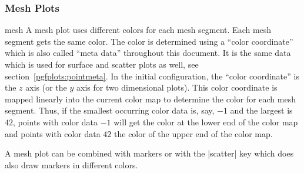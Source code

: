 \subsubsection{Mesh Plots}
\label{sec:2d:mesh}
\begin{plottype}[/pgfplots]{mesh}
	A mesh plot uses different colors for each mesh segment. Each mesh segment gets the same color. The color is determined using a ``color coordinate'' which is also called ``meta data'' throughout this document. It is the same data which is used for surface and scatter plots as well, see section~\ref{pgfplots:pointmeta}. In the initial configuration, the ``color coordinate'' is the $z$ axis (or the $y$ axis for two dimensional plots). This color coordinate is mapped linearly into the current color map to determine the color for each mesh segment. Thus, if the smallest occurring color data is, say, $-1$ and the largest is $42$, points with color data $-1$ will get the color at the lower end of the color map and points with color data $42$ the color of the upper end of the color map.

\pgfplotsexpensiveexample
\begin{codeexample}[]
\end{codeexample}

	A mesh plot can be combined with markers or with the |scatter| key which does also draw markers in different colors.

\pgfplotsexpensiveexample
\begin{codeexample}[]
\end{codeexample}

\pgfplotsexpensiveexample
\begin{codeexample}[]
\end{codeexample}


\end{plottype}
